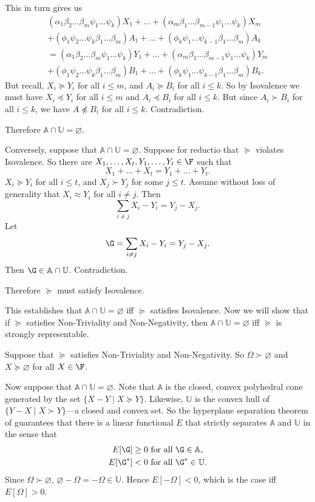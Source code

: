 This in turn gives us
\begin{multline*}
(\alpha_1\beta_2\hdots\beta_m\psi_1\hdots\psi_k)X_1+\hdots+(\alpha_m\beta_1\hdots\beta_{m-1}\psi_1\hdots\psi_k)X_m\\
+(\phi_1\psi_2\hdots\psi_k\beta_1\hdots\beta_m)A_1+\hdots+(\phi_k\psi_1\hdots\psi_{k-1}\beta_1\hdots\beta_m)A_k\\
=(\alpha_1\beta_2\hdots\beta_m\psi_1\hdots\psi_k)Y_1+\hdots+(\alpha_m\beta_1\hdots\beta_{m-1}\psi_1\hdots\psi_k)Y_m\\
+(\phi_1\psi_2\hdots\psi_k\beta_1\hdots\beta_m)B_1+\hdots+(\phi_k\psi_1\hdots\psi_{k-1}\beta_1\hdots\beta_m)B_k.
\end{multline*}
But recall, $X_i\succeq Y_i$ for all $i\leq m$, and $A_i\succeq B_i$ for all $i\leq k$. So by Isovalence we must have $X_i\preceq Y_i$ for all $i\leq m$ and $A_i\preceq B_i$ for all $i\leq k$. But since $A_i\succ B_i$ for all $i\leq k$, we have $A\not\preceq B_i$ for all $i\leq k$. Contradiction. 

Therefore $\mathbb{A}\cap\mathbb{U}=\varnothing$.

Conversely, suppose that $\mathbb{A}\cap\mathbb{U}=\varnothing$. Suppose for reductio that $\succeq$ violates Isovalence. So there are $X_1,\hdots,X_t,Y_1,\hdots,Y_t\in\F$ such that
$$ X_1+\ldots+X_t=Y_1+\ldots+Y_t. $$
$X_i\succeq Y_i$ for all $i\leq t$, and $X_j\succ Y_j$ for some $j\leq t$. Assume without loss of generality that $X_i\approx Y_i$ for all $i\not=j$. Then
$$ \sum_{i\not=j} X_i-Y_i=Y_j-X_j. $$
Let
$$ \G=\sum_{i\not=j} X_i-Y_i=Y_j-X_j. $$
Then $\G\in\mathbb{A}\cap\mathbb{U}$. Contradiction. 

Therefore $\succeq$ must satisfy Isovalence.

This establishes that $\mathbb{A}\cap\mathbb{U}=\varnothing$ iff $\succeq$ satisfies Isovalence. Now we will show that if $\succeq$ satisfies Non-Triviality and Non-Negativity, then $\mathbb{A}\cap\mathbb{U}=\varnothing$ iff $\succeq$ is strongly representable.

Suppose that $\succeq$ satisfies Non-Triviality and Non-Negativity. So $\Omega\succ \varnothing$ and $X\succeq \varnothing$ for all $X\in\F$.

Now suppose that $\mathbb{A}\cap\mathbb{U}=\varnothing$. Note that $\mathbb{A}$ is the closed, convex polyhedral cone generated by the set $\{X-Y \mathrel{|} X\succeq Y\}$. Likewise, $\mathbb{U}$ is the convex hull of $\{Y-X \mathrel{|} X\succ Y\}$---a closed and convex set. So the hyperplane separation theorem of \citet[p. 50]{Kuhn1956} guarantees that there is a linear functional $E$ that strictly separates $\mathbb{A}$ and $\mathbb{U}$ in the sense that
$$
\begin{aligned}
	E[\G]   &\geq 0 \text{ for all } \G\in\mathbb{A},\\
	E[\G^*] &<    0 \text{ for all } \G^*\in\mathbb{U}.
\end{aligned}
$$
Since $\Omega\succ \varnothing$, $\varnothing-\Omega=-\Omega\in\mathbb{U}$. Hence $E[-\Omega]<0$, which is the case iff $E[\Omega]>0$.

